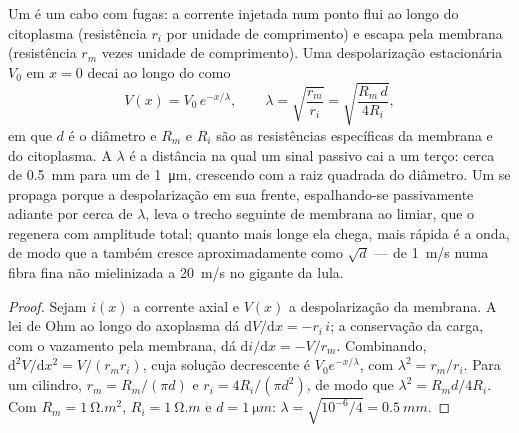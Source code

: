 \begin{theorem}\label{thm:b2:neurons-synapses:cable}
Um  é um cabo com fugas: a corrente injetada num ponto flui ao
longo do citoplasma (resistência $r_i$ por unidade de comprimento) e
escapa pela membrana (resistência $r_m$ vezes unidade de comprimento).
Uma despolarização estacionária $V_0$ em $x = 0$ decai ao longo do
 como
\[
V(x) = V_0\,e^{-x/\lambda}, \qquad \lambda = \sqrt{\frac{r_m}{r_i}} = \sqrt{\frac{R_m\,d}{4R_i}},
\]
em que $d$ é o diâmetro e $R_m$ e $R_i$ são as resistências específicas
da membrana e do citoplasma. A \emph{} $\lambda$ é a
distância na qual um sinal passivo cai a um terço: cerca de
\qty{0.5}{mm} para um  de \qty{1}{\micro m}, crescendo com a raiz
quadrada do diâmetro. Um  se propaga porque a
despolarização em sua frente, espalhando-se passivamente adiante por
cerca de $\lambda$, leva o trecho seguinte de membrana ao limiar, que o
regenera com amplitude total; quanto mais longe ela chega, mais rápida
é a onda, de modo que a  também cresce
aproximadamente como $\sqrt{d}$ --- de \qty{1}{m/s} numa fibra fina não
mielinizada a \qty{20}{m/s} no  gigante da lula.
\end{theorem}
\begin{proof}
Sejam $i(x)$ a corrente axial e $V(x)$ a despolarização da membrana. A
lei de Ohm ao longo do axoplasma dá $\mathrm{d}V/
\mathrm{d}x = -r_i\,i$; a conservação da carga, com o vazamento pela
membrana, dá $\mathrm{d}i/\mathrm{d}x = -V/r_m$. Combinando,
$\mathrm{d}^{2}V/\mathrm{d}x^{2} = V/(r_m r_i)$, cuja solução
decrescente é $V_0 e^{-x/\lambda}$, com $\lambda^{2} = r_m/r_i$. Para
um cilindro, $r_m = R_m/(\pi d)$ e $r_i = 4R_i/(\pi d^{2})$, de modo que
$\lambda^{2} = R_m d/4R_i$. Com $R_m = \qty{1}{\ohm.m^2}$, $R_i =
\qty{1}{\ohm.m}$ e $d = \qty{1}{\micro m}$: $\lambda = \sqrt{10^{-6}
/4} = \qty{0.5}{mm}$.
\end{proof}

